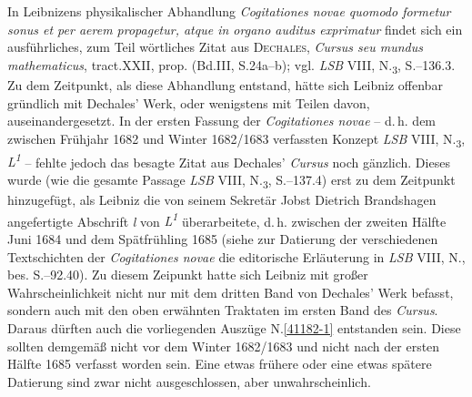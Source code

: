 In Leibnizens physikalischer Abhandlung \textit{Cogitationes novae quomodo formetur sonus et per aerem propagetur, atque in organo auditus exprimatur} findet sich ein ausführliches, zum Teil wörtliches Zitat aus \textsc{Dechales}, \textit{Cursus seu mundus mathematicus}, tract.\;XXII, prop. (Bd.\;III, S.\;24a--b);\cite{00124} vgl. \textit{LSB} VIII, N.\textsubscript{3}, S.--136.3.\cite{02529}
Zu dem Zeitpunkt, als diese Abhandlung entstand, hätte sich Leibniz offenbar gründlich mit Dechales' Werk, oder wenigstens mit Teilen davon, auseinandergesetzt.
In der ersten Fassung der \textit{Cogitationes novae} -- d.\,h. dem zwischen Frühjahr 1682 und Winter 1682/1683 verfassten Konzept \textit{LSB} VIII, N.\textsubscript{3}, \textit{L\textsuperscript{1}} -- fehlte jedoch das besagte Zitat aus Dechales' \textit{Cursus}\cite{00124} noch gänzlich.
\ledpb%
Dieses wurde (wie die gesamte Passage \textit{LSB} VIII, N.\textsubscript{3}, S.--137.4) erst zu dem Zeitpunkt hinzugefügt, als Leibniz die von seinem Sekretär Jobst Dietrich Brandshagen angefertigte Abschrift \textit{l} von \textit{L\textsuperscript{1}} überarbeitete, d.\,h. zwischen der zweiten Hälfte Juni 1684 und dem Spätfrühling 1685 (siehe zur Datierung der verschiedenen Textschichten der \textit{Cogitationes novae}\cite{02529} die editorische Erläuterung in \textit{LSB} VIII, N., bes. S.--92.40).\cite{02526}
Zu diesem Zeipunkt hatte sich Leibniz mit großer Wahrscheinlichkeit nicht nur mit dem dritten Band von Dechales' Werk befasst, sondern auch mit den oben erwähnten Traktaten im ersten Band des \textit{Cursus}.\cite{00124}
Daraus dürften auch die vorliegenden Auszüge N.\;\ref{41182-1} entstanden sein.
Diese sollten demgemäß nicht vor dem Winter 1682/1683 und nicht nach der ersten Hälfte 1685 verfasst worden sein.
Eine etwas frühere oder eine etwas spätere Datierung sind zwar nicht ausgeschlossen, aber unwahrscheinlich.
\pend%
%
\frenchspacing%
\normalsize%

